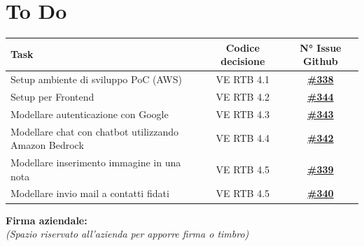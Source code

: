 \documentclass[a4paper,12pt]{article}
\newcommand{\ignoreglossary}{}
\begin{document}
\section{To Do}
\begin{center}
\small
\renewcommand{\arraystretch}{1.2} 
\begin{tabular}{|p{}|c|c|}
\hline
\rowcolor{gray!60} 
\textbf{Task} & \textbf{Codice decisione} & \textbf{N° Issue Github} \\
\hline
\rowcolor{white}
Setup ambiente di sviluppo PoC (AWS) & VE \ignoreglossary{RTB} 4.1 & \href{https://github.com/SWE-BitByBit/SWE-docs/issues/338}{\textbf{\#338}} \\
\hline
\rowcolor{gray!20}
Setup per Frontend & VE \ignoreglossary{RTB} 4.2 & \href{https://github.com/SWE-BitByBit/SWE-docs/issues/344}{\textbf{\#344}} \\
\hline
\rowcolor{white}
Modellare autenticazione con Google & VE \ignoreglossary{RTB} 4.3 & \href{https://github.com/SWE-BitByBit/SWE-docs/issues/343}{\textbf{\#343}} \\
\hline
\rowcolor{gray!20}
Modellare chat con chatbot utilizzando Amazon Bedrock & VE \ignoreglossary{RTB} 4.4 & \href{https://github.com/SWE-BitByBit/SWE-docs/issues/342}{\textbf{\#342}} \\
\hline
\rowcolor{white}
Modellare inserimento immagine in una nota & VE \ignoreglossary{RTB} 4.5 & \href{https://github.com/SWE-BitByBit/SWE-docs/issues/339}{\textbf{\#339}} \\
\rowcolor{gray!20}
Modellare invio mail a contatti fidati & VE \ignoreglossary{RTB} 4.5 & \href{https://github.com/SWE-BitByBit/SWE-docs/issues/340}{\textbf{\#340}} \\
\hline
\end{tabular}
\end{center}

\vspace*{\fill}
\noindent
\begin{minipage}{0.60\textwidth}
    {\small
    \textbf{Firma aziendale:}\\[0.3cm]
    \textit{(Spazio riservato all’azienda per apporre firma o timbro)}\\[0.8cm]
    \fbox{\rule{0pt}{2.5cm}\rule{5cm}{0pt}} 
    }
\end{minipage}
\end{document}
